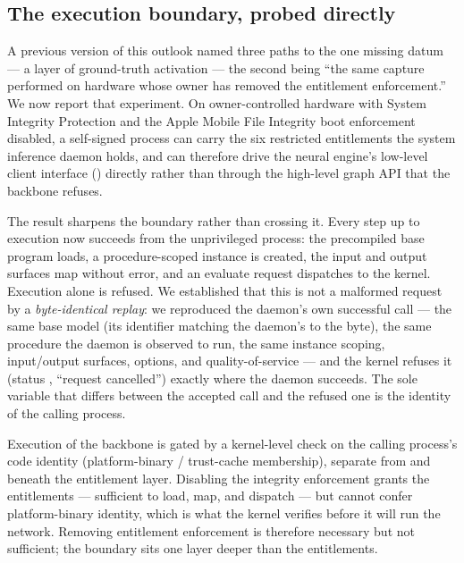 \subsection{The execution boundary, probed directly}\label{sec:gap-exec}

A previous version of this outlook named three paths to the one missing datum --- a layer of
ground-truth activation --- the second being ``the same capture performed on hardware whose owner
has removed the entitlement enforcement.'' We now report that experiment. On owner-controlled
hardware with System Integrity Protection and the Apple Mobile File Integrity boot enforcement
disabled, a self-signed process can carry the six restricted entitlements the system inference
daemon holds, and can therefore drive the neural engine's low-level client interface
() directly rather than through the high-level graph API that the backbone refuses.

The result sharpens the boundary rather than crossing it. Every step up to execution now succeeds
from the unprivileged process: the precompiled base program loads, a procedure-scoped instance is
created, the input and output surfaces map without error, and an evaluate request dispatches to the
kernel. Execution alone is refused. We established that this is not a malformed request by a
\emph{byte-identical replay}: we reproduced the daemon's own successful call --- the same base model
(its identifier matching the daemon's to the byte), the same procedure the daemon is observed to
run, the same instance scoping, input/output surfaces, options, and quality-of-service --- and the
kernel refuses it (status , ``request cancelled'') exactly where the daemon succeeds. The
sole variable that differs between the accepted call and the refused one is the identity of the
calling process.

\begin{finding}
Execution of the backbone is gated by a kernel-level check on the calling process's code identity
(platform-binary / trust-cache membership), separate from and beneath the entitlement layer.
Disabling the integrity enforcement grants the entitlements --- sufficient to load, map, and
dispatch --- but cannot confer platform-binary identity, which is what the kernel verifies before it
will run the network. Removing entitlement enforcement is therefore necessary but not sufficient;
the boundary sits one layer deeper than the entitlements.
\end{finding}


